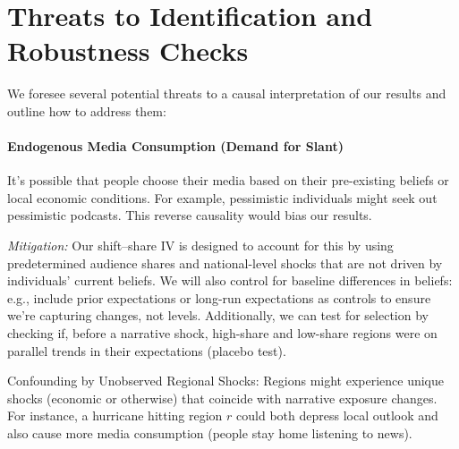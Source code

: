 \documentclass[12pt]{article}
\begin{document}
\section{Threats to Identification and Robustness Checks}
We foresee several potential threats to a causal interpretation of our results and outline how to address them:

\paragraph{Endogenous Media Consumption (Demand for Slant)}
It's possible that people choose their media based on their pre-existing beliefs or local economic conditions. For example, pessimistic individuals might seek out pessimistic podcasts. This reverse causality would bias our results.

\textit{Mitigation:} Our shift–share IV is designed to account for this by using predetermined audience shares and national-level shocks that are not driven by individuals' current beliefs. We will also control for baseline differences in beliefs: e.g., include prior expectations or long-run expectations as controls to ensure we're capturing changes, not levels. Additionally, we can test for selection by checking if, before a narrative shock, high-share and low-share regions were on parallel trends in their expectations (placebo test).

Confounding by Unobserved Regional Shocks: Regions might experience unique shocks (economic or otherwise) that coincide with narrative exposure changes. For instance, a hurricane hitting region $r$ could both depress local outlook and also cause more media consumption (people stay home listening to news).
\end{document}
